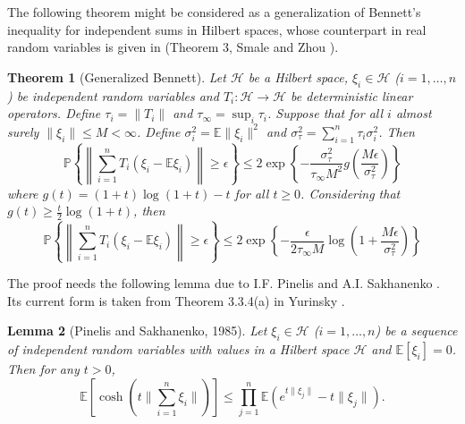 \documentclass[twoside]{amsart}
\theoremstyle{theorem}
\newtheorem{thm}{Theorem}[section]
\newtheorem{lem}[thm]{Lemma}
\theoremstyle{definition}
\theoremstyle{remark}
\def\H{{\mathscr H}}
\newcommand{\DS}{\displaystyle}
\def\P{{\mathbb P}}        %
\def\E{{\mathbb E}}        %
\begin{document}
The following theorem might be considered as a generalization of
Bennett's inequality for independent sums in Hilbert spaces, whose
counterpart in real random variables is given in (Theorem 3,
Smale and Zhou \cite{SmaZho-ShannonII}).
\begin{thm}[Generalized Bennett] \label{thm:GBennett}
Let $\H$ be a Hilbert space, $\xi_i\in \H$ ($i=1,\ldots,n$) be independent random variables and $T_i: \H\to \H$ be deterministic linear operators. Define
$\tau_i = \| T_i \|$ and $\tau_\infty=\sup_i \tau_i$. Suppose that for all $i$ almost surely $\|\xi_i\|\leq M<\infty$.
Define $\sigma_i^2=\E\|\xi_i\|^2$ and $\sigma^2_\tau=\sum_{i=1}^n \tau_i \sigma^2_i$. Then
\[ \P \left\{ \left\|\sum_{i=1}^n T_i (\xi_i-\E \xi_i) \right\| \geq \epsilon \right\} \leq
2 \exp \left\{-\frac{\sigma^2_\tau}{\tau_\infty M^2} g\left(\frac{M\epsilon}{\sigma^2_\tau}\right)\right\} \]
where $\DS g(t)=(1+t)\log(1+t)-t$ for all $t\geq 0$. Considering that $\DS g(t)\geq \frac{t}{2}\log(1+t)$, then
\[ \P \left\{ \left\|\sum_{i=1}^n T_i (\xi_i-\E \xi_i) \right\| \geq \epsilon \right\} \leq
2 \exp \left\{-\frac{\epsilon}{2\tau_\infty M} \log\left(1+\frac{M\epsilon}{\sigma^2_\tau}\right)\right\} \]
\end{thm}

The proof needs the following lemma due to I.F. Pinelis and A.I. Sakhanenko \cite{PinSak85}. Its current
form is taken from Theorem 3.3.4(a) in Yurinsky \cite{Yurinsky95}.
\begin{lem}[Pinelis and Sakhanenko, 1985]
Let $\xi_i\in \H$ ($i=1,\ldots,n$) be a sequence of independent
random variables with values in a Hilbert space $\H$ and
$\E[\xi_i]=0$. Then for any $t>0$,
\[ \E \left[\cosh\left(t \|\sum_{i=1}^n \xi_i \| \right) \right] \leq \prod_{j=1}^n \E \left( e^{t \|\xi_j\|} - t \|\xi_j\| \right). \]
\end{lem}
\end{document}
